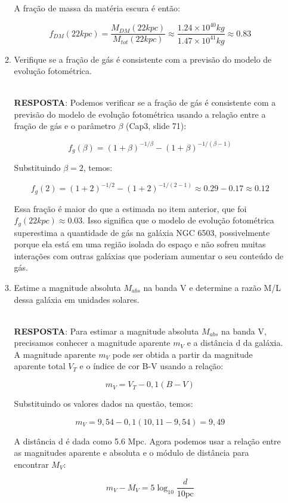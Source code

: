 \documentclass[a4paper,12pt]{article}
\begin{document}
\begin{enumerate}
\begin{enumerate}
A fração de massa da matéria escura é então:

$$f_{DM}(22 kpc) = \frac{M_{DM}(22 kpc)}{M_{tot}(22 kpc)} \approx \frac{1.24 \times 10^{40} kg}{1.47 \times 10^{41} kg} \approx 0.83$$

\noindent\hrulefill

\item Verifique se a fração de gás é consistente com a previsão do modelo de evolução fotométrica.

\noindent\hrulefill\\\textbf{RESPOSTA}: Podemos verificar se a fração de gás é consistente com a previsão do modelo de evolução fotométrica usando a relação entre a fração de gás e o parâmetro $\beta$ (Cap3, slide 71):

$$f_g(\beta) = (1 + \beta)^{-1/\beta} - (1 + \beta)^{-1/(\beta-1)}$$

Substituindo $\beta = 2$, temos:

$$f_g(2) = (1 +2)^{-1/2} - (1 +2)^{-1/(2-1)} \approx0 .29 -0 .17\approx0 .12 $$

Essa fração é maior do que a estimada no item anterior, que foi $f_g(22 kpc) \approx0 .03$. Isso significa que o modelo de evolução fotométrica superestima a quantidade de gás na galáxia NGC 6503, possivelmente porque ela está em uma região isolada do espaço e não sofreu muitas interações com outras galáxias que poderiam aumentar o seu conteúdo de gás.

\noindent\hrulefill

\item Estime a magnitude absoluta $M_{abs}$ na banda V e determine a razão M/L dessa galáxia em unidades solares.

\noindent\hrulefill\\\textbf{RESPOSTA}: Para estimar a magnitude absoluta $M_{abs}$ na banda V, precisamos conhecer a magnitude aparente $m_V$ e a distância d da galáxia. A magnitude aparente $m_V$ pode ser obtida a partir da magnitude aparente total $V_T$ e o índice de cor B-V usando a relação:

$$m_V = V_T - 0,1(B-V)$$

Substituindo os valores dados na questão, temos:

$$m_V = 9,54 - 0,1(10,11 - 9,54) = 9,49$$

A distância d é dada como 5.6 Mpc. Agora podemos usar a relação entre as magnitudes aparente e absoluta e o módulo de distância para encontrar $M_V$:

$$m_V - M_V = 5 \log_{10} \frac{d}{10 \text{pc}}$$


\end{enumerate}
\end{enumerate}
\end{document}
